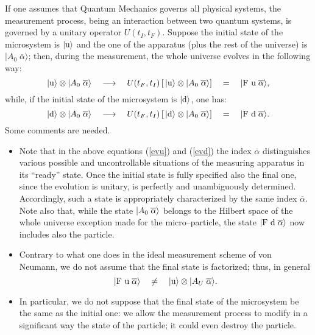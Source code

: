 \documentclass[12pt]{article}
\begin{document}
If one assumes that Quantum Mechanics governs all physical
systems, the measurement process, being an interaction between two
quantum systems, is governed by a unitary operator $U(t_{I},
t_{F})$. Suppose the initial state of the microsystem is
$|\makebox{u}\rangle$ and the one of the apparatus (plus the rest
of the universe) is $|A_{0}\; \overline{\alpha}\rangle$; then,
during the measurement, the whole universe evolves in the
following way:
\begin{equation} \label{evu}
|\makebox{u}\rangle\otimes|\makebox{$A_{0}$}\; \overline{\alpha}
\rangle \quad \longrightarrow \quad U(t_{F}, t_{I})\left[\,
|\makebox{u}\rangle\otimes| \makebox{$A_{0}$}\; \overline{\alpha}
\rangle \right]\quad =\quad |\makebox{F u}\; \overline{\alpha}
\rangle,
\end{equation}
while, if the initial state of the microsystem is
$|\makebox{d}\rangle$,  one has:
\begin{equation} \label{evd}
|\makebox{d}\rangle\otimes|\makebox{$A_{0}$}\; \overline{\alpha}
\rangle \quad \longrightarrow \quad U(t_{F}, t_{I})\left[\,
|\makebox{d}\rangle\otimes| \makebox{$A_{0}$}\; \overline{\alpha}
\rangle \right]\quad =\quad |\makebox{F d}\; \overline{\alpha}
\rangle.
\end{equation}
Some comments are needed.
\begin{itemize}
\item Note that in the above equations (\ref{evu}) and (\ref{evd})
the index $\overline{\alpha}$ distinguishes various possible and
uncontrollable situations of the measuring apparatus in its
``ready'' state. Once the initial state is fully specified also
the final one, since the evolution is unitary, is perfectly and
unambiguously determined. Accordingly, such a state is
appropriately characterized by the same index $\overline{\alpha}$.
Note also that, while the state $|\makebox{$A_{0}$}\;
\overline{\alpha} \rangle$ belongs to the Hilbert space of the
whole universe exception made for the micro--particle, the state
$|\makebox{F d}\; \overline{\alpha}\rangle$ now includes also the
particle.

\item Contrary to what one does in the ideal measurement
scheme of von Neumann, we do not assume that  the final state is
factorized; thus, in general
\[ |\makebox{F u}\; \overline{\alpha} \rangle \quad \neq \quad
|\makebox{u}\rangle \otimes |A_{U}\; \overline{\alpha}\rangle.
\]
\item In particular, we do not suppose that the final state of the
microsystem be the same as the initial one: we allow the
measurement process to modify in a significant way the state of
the particle; it could even destroy the particle.
\end{itemize}
\end{document}
